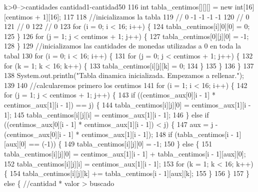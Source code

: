 \begin{DoxyCode}
{       k>0-->cantidades cantidad1-cantidad50}
116         \textcolor{keywordtype}{int} tabla\_centimos[][][] = \textcolor{keyword}{new} \textcolor{keywordtype}{int}[16][centimos + 1][16];
117 
118         \textcolor{comment}{//inicializamos la tabla }
119         \textcolor{comment}{//  0   -1  -1  -1  -1}
120         \textcolor{comment}{//  0}
121         \textcolor{comment}{//  0}
122         \textcolor{comment}{//  0}
123         \textcolor{keywordflow}{for} (i = 0; i < 16; i++) \{
124             tabla\_centimos[i][0][0] = 0;
125         \}
126         \textcolor{keywordflow}{for} (j = 1; j < centimos + 1; j++) \{
127             tabla\_centimos[0][j][0] = -1;
128         \}
129         \textcolor{comment}{//inicializamos las cantidades de monedas utilizadas a 0 en toda la tabal}
130         \textcolor{keywordflow}{for} (i = 0; i < 16; i++) \{
131             \textcolor{keywordflow}{for} (j = 0; j < centimos + 1; j++) \{
132                 \textcolor{keywordflow}{for} (k = 1; k < 16; k++) \{
133                     tabla\_centimos[i][j][k] = 0;
134                 \}
135             \}
136         \}
137         
138         System.out.println(\textcolor{stringliteral}{"Tabla dinamica inicializada. Empezamos a rellenar."});
139 
140         \textcolor{comment}{//calcularemos primero los centimos}
141         \textcolor{keywordflow}{for} (i = 1; i < 16; i++) \{
142             \textcolor{keywordflow}{for} (j = 1; j < centimos + 1; j++) \{
143                 \textcolor{keywordflow}{if} ((centimos\_aux[0][i - 1] * centimos\_aux[1][i - 1]) == j) \{
144                     tabla\_centimos[i][j][0] = centimos\_aux[1][i - 1];
145                     tabla\_centimos[i][j][i] = centimos\_aux[1][i - 1];
146                 \} \textcolor{keywordflow}{else} \textcolor{keywordflow}{if} ((centimos\_aux[0][i - 1] * centimos\_aux[1][i - 1]) < j) \{
147                     aux = j - (centimos\_aux[0][i - 1] * centimos\_aux[1][i - 1]);
148                     \textcolor{keywordflow}{if} (tabla\_centimos[i - 1][aux][0] == (-1)) \{
149                         tabla\_centimos[i][j][0] = -1;
150                     \} \textcolor{keywordflow}{else} \{
151                         tabla\_centimos[i][j][0] = centimos\_aux[1][i - 1] + tabla\_centimos[i - 1][aux][0];
152                         tabla\_centimos[i][j][i] = centimos\_aux[1][i - 1];
153                         \textcolor{keywordflow}{for} (k = 1; k < 16; k++) \{
154                             tabla\_centimos[i][j][k] += tabla\_centimos[i - 1][aux][k];
155                         \}
156                     \}
157                 \} \textcolor{keywordflow}{else} \{ \textcolor{comment}{//cantidad * valor > buscado}

\end{DoxyCode}
